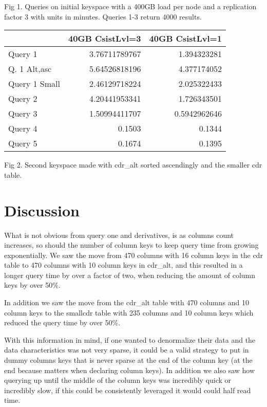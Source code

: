 \documentclass[letterpaper]{article}
\begin{document}
Fig 1. Queries on initial keyspace with a 400GB load per node and a replication factor 3 with units in minutes. Queries 1-3 return 4000 results.
\\

\begin{tabular}[h]{|l|r|r|}
\hline
& 40GB CsistLvl=3 & 40GB CsistLvl=1 \\ \hline
Query 1       & 3.76711789767 & 1.394323281 \\
Q. 1 Alt,asc    & 5.64526818196 & 4.377174052 \\
Query 1 Small  & 2.46129718224 & 2.025322433 \\
Query 2        & 4.20441953341 & 1.726343501 \\
Query 3        & 1.50994411707 & 0.5942962646 \\
Query 4       & 0.1503 & 0.1344 \\
Query 5       & 0.1674 & 0.1395 \\
\hline
\end{tabular}

Fig 2. Second keyspace made with cdr\_alt sorted ascendingly and the smaller cdr table.

\section{Discussion}

What is not obvious from query one and derivatives, is as columns count increases, so should the number 
of column keys to keep query time from growing exponentially.
We saw the move from 470 columns with 16 column keys in the cdr table to 470 columns with 10 column
keys in cdr\_alt, and this resulted in a
longer query time by over a factor of two, when reducing the amount of column keys by over 50\%.

In addition we saw the move from the cdr\_alt table with 470 columns and 10 column keys to the smallcdr table with 235 columns and 10 column keys which
reduced the query time by over 50\%. 

With this information in mind, if one wanted to denormalize their data and the data characteristics was
not very sparse, it could be a valid strategy to put in dummy columns keys that is never sparse at the
end of the column key (at the end because matters when declaring column keys). In addition we also
saw how querying up until the middle of the column keys was incredibly quick or incredibly slow, if 
this could be consistently leveraged it would could half read time.
\end{document}
